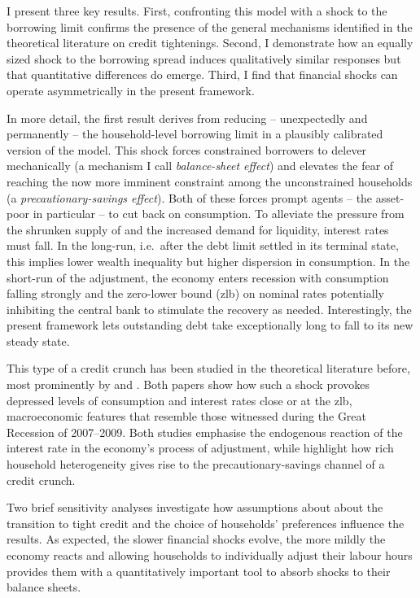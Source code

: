 \documentclass[a4paper,12pt]{article} %
\numberwithin{equation}{section} %
\numberwithin{figure}{section}
\numberwithin{table}{section}
\begin{document}

I present three key results. First, confronting this model with a shock to the borrowing limit confirms the presence of the general mechanisms identified in the theoretical literature on credit tightenings. Second, I demonstrate how an equally sized shock to the borrowing spread induces qualitatively similar responses but that quantitative differences do emerge. Third, I find that financial shocks can operate asymmetrically in the present framework.

In more detail, the first result derives from reducing -- unexpectedly and permanently -- the household-level borrowing limit in a plausibly calibrated version of the model. This shock forces constrained borrowers to delever mechanically (a mechanism I call \textit{balance-sheet effect}) and elevates the fear of reaching the now more imminent constraint among the unconstrained households (a \textit{precautionary-savings effect}). Both of these forces prompt agents -- the asset-poor in particular -- to cut back on consumption. To alleviate the pressure from the shrunken supply of and the increased demand for liquidity, interest rates must fall. In the long-run, i.e.~after the debt limit settled in its terminal state, this implies lower wealth inequality but higher dispersion in consumption. In the short-run of the adjustment, the economy enters recession with consumption falling strongly and the zero-lower bound (\Gls{zlb}) on nominal rates potentially inhibiting the central bank to stimulate the recovery as needed. Interestingly, the present framework lets outstanding debt take exceptionally long to fall to its new steady state.

This type of a credit crunch has been studied in the theoretical literature before, most prominently by \textcite{egg2012} and \textcite{gl2017}. Both papers show how such a shock provokes depressed levels of consumption and interest rates close or at the \Gls{zlb}, macroeconomic features that resemble those witnessed during the Great Recession of 2007--2009. Both studies emphasise the endogenous reaction of the interest rate in the economy's process of adjustment, while \textcite{gl2017} highlight how rich household heterogeneity gives rise to the precautionary-savings channel of a credit crunch.

Two brief sensitivity analyses investigate how assumptions about about the transition to tight credit and the choice of households' preferences influence the results. As expected, the slower financial shocks evolve, the more mildly the economy reacts and allowing households to individually adjust their labour hours provides them with a quantitatively important tool to absorb shocks to their balance sheets.
\end{document}
